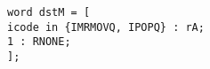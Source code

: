 \documentclass{article}
\begin{document}
\texttt{word dstM = [ \\
\hspace*{17mm} icode in \{IMRMOVQ, IPOPQ\} : rA; \\
\hspace*{17mm} 1 : RNONE; \\
\hspace*{5mm}];}
\end{document}
